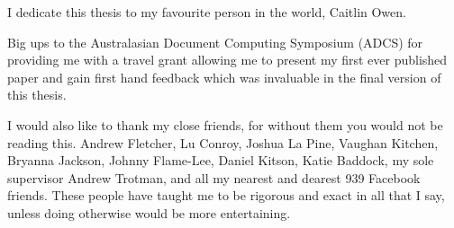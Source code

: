 I dedicate this thesis to my favourite person in the world, Caitlin Owen.

Big ups to the Australasian Document Computing Symposium (ADCS) for providing me with a travel grant allowing me to present my first ever published paper and gain first hand feedback which was invaluable in the final version of this thesis.

I would also like to thank my close friends, for without them you would not be reading this. Andrew Fletcher, Lu Conroy, Joshua La Pine, Vaughan Kitchen, Bryanna Jackson, Johnny Flame-Lee, Daniel Kitson, Katie Baddock, my sole supervisor Andrew Trotman, and all my nearest and dearest 939 Facebook friends. These people have taught me to be rigorous and exact in all that I say, unless doing otherwise would be more entertaining.

